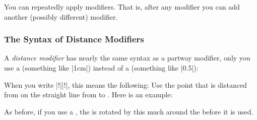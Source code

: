 \begin{codeexample}[preamble={\usetikzlibrary{calc}}]
\end{codeexample}

You can repeatedly apply modifiers. That is, after any modifier you can add
another (possibly different) modifier.
%
\begin{codeexample}[preamble={\usetikzlibrary{calc}}]
\end{codeexample}


\subsubsection{The Syntax of Distance Modifiers}

A \emph{distance modifier} has nearly the same syntax as a partway modifier,
only you use a  (something like |1cm|) instead of a
 (something like |0.5|):
%
\begin{quote}
\end{quote}

When you write |!||!|, this means the
following: Use the point that is distanced  from  on
the straight line from  to . Here is an example:
%
\begin{codeexample}[preamble={\usetikzlibrary{calc}}]
\end{codeexample}

As before, if you use a , the  is rotated
by this much around the  before it is used.

